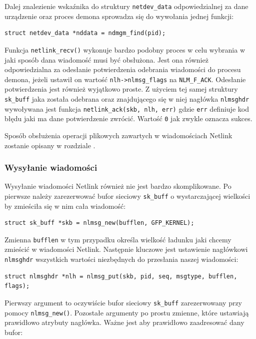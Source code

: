 \documentclass[11pt]{scrartcl}
\begin{document}
Dalej znalezienie wskaźnika do struktury \texttt{netdev\_data} odpowiedzialnej za dane urządzenie oraz proces demona sprowadza się do wywołania jednej funkcji:

\begin{verbatim}
struct netdev_data *nddata = ndmgm_find(pid);
\end{verbatim}

Funkcja \texttt{netlink\_recv()} wykonuje bardzo podobny proces w celu wybrania w jaki sposób dana wiadomość musi być obsłużona. Jest ona również odpowiedzialna za odesłanie potwierdzenia odebrania wiadomości do procesu demona, jeżeli ustawił on wartość \texttt{nlh-\textgreater{}nlmsg\_flags} na \texttt{NLM\_F\_ACK}.  Odesłanie potwierdzenia jest również wyjątkowo proste. Z użyciem tej samej struktury \texttt{sk\_buff} jaka została odebrana oraz znajdującego się w niej nagłówka \texttt{nlmsghdr} wywoływana jest funkcja \texttt{netlink\_ack(skb, nlh, err)} gdzie \texttt{err} definiuje kod błędu jaki ma dane potwierdzenie zwrócić. Wartość \texttt{0} jak zwykle oznacza sukces.

Sposób obsłużenia operacji plikowych zawartych w wiadomościach Netlink zostanie opisany w rozdziale .

\subsubsection{Wysyłanie wiadomości}
\label{msgsend}

Wysyłanie wiadomości Netlink również nie jest bardzo skomplikowane. Po pierwsze należy zarezerwować bufor sieciowy \texttt{sk\_buff} o wystarczającej wielkości by zmieściła się w nim cała wiadomość:

\begin{verbatim}
struct sk_buff *skb = nlmsg_new(bufflen, GFP_KERNEL);
\end{verbatim}

Zmienna \texttt{bufflen} w tym przypadku określa wielkość ładunku jaki chcemy zmieścić w wiadomości Netlink. Następnie kluczowe jest ustawienie nagłówkowi \texttt{nlmsghdr} wszystkich wartości niezbędnych do przesłania naszej wiadomości:

\begin{verbatim}
struct nlmsghdr *nlh = nlmsg_put(skb, pid, seq, msgtype, bufflen, flags);
\end{verbatim}

Pierwszy argument to oczywiście bufor sieciowy \texttt{sk\_buff} zarezerwowany przy pomocy \texttt{nlmsg\_new()}. Pozostałe argumenty po prostu zmienne, które ustawiają prawidłowo atrybuty nagłówka. Ważne jest aby prawidłowo zaadresować dany bufor:
\end{document}
